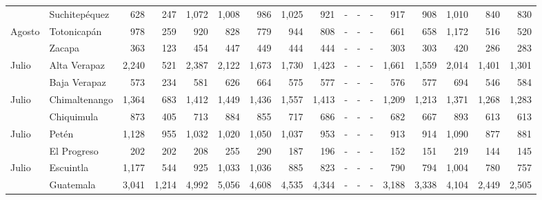 \begin{landscape}
\begin{center}
\begin{longtable}{llrrrrrrrrrrrrrrr}
			\rowcolor{color1!5!white}\multicolumn{1}{l}{	\footnotesize	 Agosto 	}&	 Suchitepéquez 	&	 628 	&	 247 	&	 1,072 	&	 1,008 	&	 986 	&	 1,025 	&	 921 	&	 -   	&	 -   	&	 -   	&	 917 	&	 908 	&	 1,010 	&	 840 	&	 830 	\\
			\multicolumn{1}{l}{	\footnotesize	 Agosto 	}&	 Totonicapán 	&	 978 	&	 259 	&	 920 	&	 828 	&	 779 	&	 944 	&	 808 	&	 -   	&	 -   	&	 -   	&	 661 	&	 658 	&	 1,172 	&	 516 	&	 520 	\\
			\rowcolor{color1!5!white}\multicolumn{1}{l}{	\footnotesize	 Agosto 	}&	 Zacapa 	&	 363 	&	 123 	&	 454 	&	 447 	&	 449 	&	 444 	&	 444 	&	 -   	&	 -   	&	 -   	&	 303 	&	 303 	&	 420 	&	 286 	&	 283 	\\
			\multicolumn{1}{l}{	\footnotesize	 Julio 	}&	 Alta Verapaz 	&	 2,240 	&	 521 	&	 2,387 	&	 2,122 	&	 1,673 	&	 1,730 	&	 1,423 	&	 -   	&	 -   	&	 -   	&	 1,661 	&	 1,559 	&	 2,014 	&	 1,401 	&	 1,301 	\\
			\rowcolor{color1!5!white}\multicolumn{1}{l}{	\footnotesize	 Julio 	}&	 Baja Verapaz 	&	 573 	&	 234 	&	 581 	&	 626 	&	 664 	&	 575 	&	 577 	&	 -   	&	 -   	&	 -   	&	 576 	&	 577 	&	 694 	&	 546 	&	 584 	\\
			\multicolumn{1}{l}{	\footnotesize	 Julio 	}&	 Chimaltenango 	&	 1,364 	&	 683 	&	 1,412 	&	 1,449 	&	 1,436 	&	 1,557 	&	 1,413 	&	 -   	&	 -   	&	 -   	&	 1,209 	&	 1,213 	&	 1,371 	&	 1,268 	&	 1,283 	\\
			\rowcolor{color1!5!white}\multicolumn{1}{l}{	\footnotesize	 Julio 	}&	 Chiquimula 	&	 873 	&	 405 	&	 713 	&	 884 	&	 855 	&	 717 	&	 686 	&	 -   	&	 -   	&	 -   	&	 682 	&	 667 	&	 893 	&	 613 	&	 613 	\\
			\multicolumn{1}{l}{	\footnotesize	 Julio 	}&	 Petén 	&	 1,128 	&	 955 	&	 1,032 	&	 1,020 	&	 1,050 	&	 1,037 	&	 953 	&	 -   	&	 -   	&	 -   	&	 913 	&	 914 	&	 1,090 	&	 877 	&	 881 	\\
			\rowcolor{color1!5!white}\multicolumn{1}{l}{	\footnotesize	 Julio 	}&	 El Progreso 	&	 202 	&	 202 	&	 208 	&	 255 	&	 290 	&	 187 	&	 196 	&	 -   	&	 -   	&	 -   	&	 152 	&	 151 	&	 219 	&	 144 	&	 145 	\\
			\multicolumn{1}{l}{	\footnotesize	 Julio 	}&	 Escuintla 	&	 1,177 	&	 544 	&	 925 	&	 1,033 	&	 1,036 	&	 885 	&	 823 	&	 -   	&	 -   	&	 -   	&	 790 	&	 794 	&	 1,004 	&	 780 	&	 757 	\\
			\rowcolor{color1!5!white}\multicolumn{1}{l}{	\footnotesize	 Julio 	}&	 Guatemala 	&	 3,041 	&	 1,214 	&	 4,992 	&	 5,056 	&	 4,608 	&	 4,535 	&	 4,344 	&	 -   	&	 -   	&	 -   	&	 3,188 	&	 3,338 	&	 4,104 	&	 2,449 	&	 2,505 	\\

\end{longtable}
\end{center}
\end{landscape}
